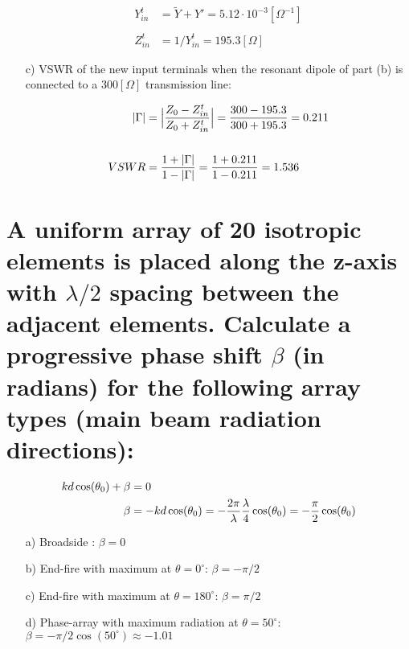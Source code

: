 \documentclass[12pt, letterpaper]{article}
\begin{document}
\begin{itemize}
  \begin{align*}
    Y_{in}^t
    &=
    \tilde{Y}
    +
    Y'
    =
    5.12\cdot10^{-3}[\Omega^{-1}]
    \\\\
    Z_{in}^t
    &=
    1/Y_{in}^t
    =
    195.3[\Omega]
  \end{align*}

  \item [c)] VSWR of the new input terminals when the resonant dipole of part (b) is connected to a $300[\Omega]$ transmission line:

  \begin{align*}
    |\Gamma|
    &=
    \Big|
    {
      Z_0-Z_{in}^t
      \over
      Z_0+Z_{in}^t
    }
    \Big|
    =
    {
      300-195.3
      \over
      300+195.3
    }
    =
    0.211
    \\\\
    VSWR
    &=
    {
      1+|\Gamma|
      \over
      1-|\Gamma|
    }
    =
    {
      1+0.211
      \over
      1-0.211
    }
    =
    1.536
  \end{align*}
\end{itemize}


\section{A uniform array of 20 isotropic elements is placed along the z-axis with $\lambda/2$ spacing between the adjacent elements. Calculate a progressive phase shift $\beta$ (in radians) for the following array types (main beam radiation directions):}

\begin{align*}
  kd\cos(\theta_0)+\beta
  &=
  0
  \\
  \beta&=-kd\cos(\theta_0)
  =
  -{2\pi\over\lambda}{\lambda\over4}\cos(\theta_0)
  =
  -{\pi\over2}\cos(\theta_0)
\end{align*}

\begin{itemize}
  \item [a)] Broadside :
  $\beta = 0$
  \item [b)] End-fire with maximum at $\theta=0^{\circ}$:
  $\beta = -\pi/2$
  \item [c)] End-fire with maximum at $\theta=180^{\circ}$:
  $\beta = \pi/2$
  \item [d)] Phase-array with maximum radiation at $\theta=50^{\circ}$:
  $\beta = -\pi/2\cos(50^{\circ})\approx -1.01$
\end{itemize}
\end{document}
